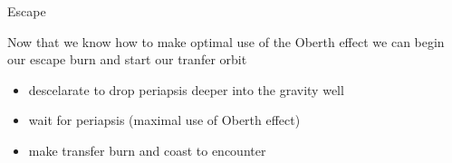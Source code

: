 \begin{frame}[t]{Escape}
    \begin{block}{}
        Now that we know how to make optimal use of the Oberth effect we can begin our escape burn and start our tranfer orbit
    \end{block}
    \begin{block}{}
        \begin{itemize}
            \item descelarate to drop periapsis deeper into the gravity well
            \item wait for periapsis (maximal use of Oberth effect)
            \item make transfer burn and coast to encounter
        \end{itemize}
    \end{block}
\end{frame}
